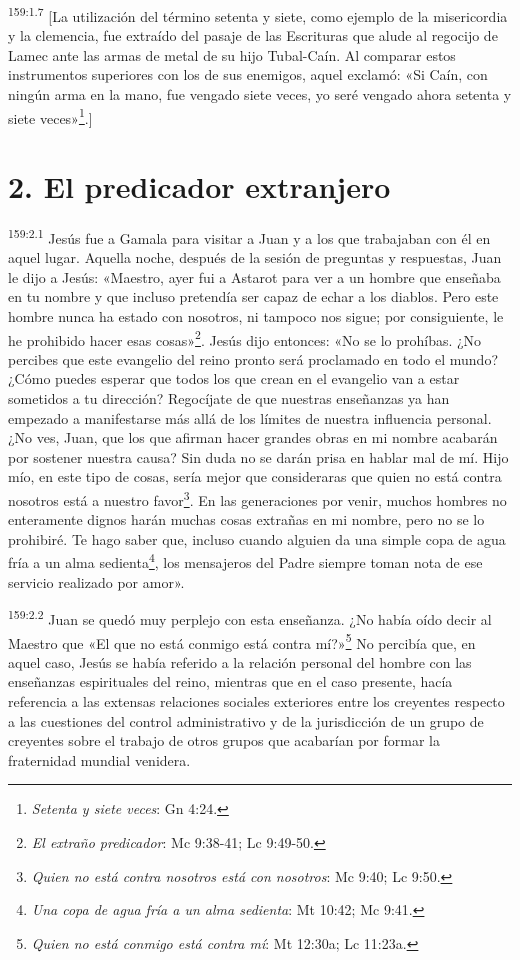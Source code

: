 \par
\textsuperscript{159:1.7} [La utilización del término setenta y siete, como ejemplo de la misericordia y la clemencia, fue extraído del pasaje de las Escrituras que alude al regocijo de Lamec ante las armas de metal de su hijo Tubal-Caín. Al comparar estos instrumentos superiores con los de sus enemigos, aquel exclamó: «Si Caín, con ningún arma en la mano, fue vengado siete veces, yo seré vengado ahora setenta y siete veces»\footnote{\textit{Setenta y siete veces}: Gn 4:24.}.]

\section*{2. El predicador extranjero}
\par
\textsuperscript{159:2.1} Jesús fue a Gamala para visitar a Juan y a los que trabajaban con él en aquel lugar. Aquella noche, después de la sesión de preguntas y respuestas, Juan le dijo a Jesús: «Maestro, ayer fui a Astarot para ver a un hombre que enseñaba en tu nombre y que incluso pretendía ser capaz de echar a los diablos. Pero este hombre nunca ha estado con nosotros, ni tampoco nos sigue; por consiguiente, le he prohibido hacer esas cosas»\footnote{\textit{El extraño predicador}: Mc 9:38-41; Lc 9:49-50.}. Jesús dijo entonces: «No se lo prohíbas. ¿No percibes que este evangelio del reino pronto será proclamado en todo el mundo? ¿Cómo puedes esperar que todos los que crean en el evangelio van a estar sometidos a tu dirección? Regocíjate de que nuestras enseñanzas ya han empezado a manifestarse más allá de los límites de nuestra influencia personal. ¿No ves, Juan, que los que afirman hacer grandes obras en mi nombre acabarán por sostener nuestra causa? Sin duda no se darán prisa en hablar mal de mí. Hijo mío, en este tipo de cosas, sería mejor que consideraras que quien no está contra nosotros está a nuestro favor\footnote{\textit{Quien no está contra nosotros está con nosotros}: Mc 9:40; Lc 9:50.}. En las generaciones por venir, muchos hombres no enteramente dignos harán muchas cosas extrañas en mi nombre, pero no se lo prohibiré. Te hago saber que, incluso cuando alguien da una simple copa de agua fría a un alma sedienta\footnote{\textit{Una copa de agua fría a un alma sedienta}: Mt 10:42; Mc 9:41.}, los mensajeros del Padre siempre toman nota de ese servicio realizado por amor».

\par
\textsuperscript{159:2.2} Juan se quedó muy perplejo con esta enseñanza. ¿No había oído decir al Maestro que «El que no está conmigo está contra mí?»\footnote{\textit{Quien no está conmigo está contra mí}: Mt 12:30a; Lc 11:23a.} No percibía que, en aquel caso, Jesús se había referido a la relación personal del hombre con las enseñanzas espirituales del reino, mientras que en el caso presente, hacía referencia a las extensas relaciones sociales exteriores entre los creyentes respecto a las cuestiones del control administrativo y de la jurisdicción de un grupo de creyentes sobre el trabajo de otros grupos que acabarían por formar la fraternidad mundial venidera.


